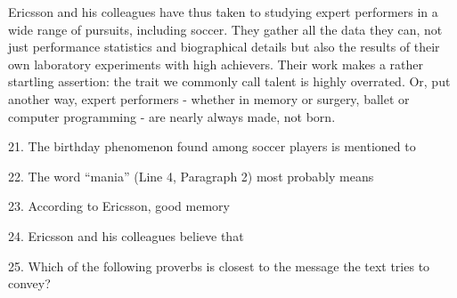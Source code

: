 \qquad Ericsson and his colleagues have thus taken to studying expert performers in a wide range of pursuits, including soccer. They gather all the data they can, not just performance statistics and biographical details but also the results of their own laboratory experiments with high achievers. Their work makes a rather startling assertion: the trait we commonly call talent is highly overrated. Or, put another way, expert performers - whether in memory or surgery, ballet or computer programming - are nearly always made, not born.

\vspace{6pt}

21. The birthday phenomenon found among soccer players is mentioned to\par

22. The word ``mania'' (Line 4, Paragraph 2) most probably means\par

23. According to Ericsson, good memory\par

24. Ericsson and his colleagues believe that\par

25. Which of the following proverbs is closest to the message the text tries to convey?\par
